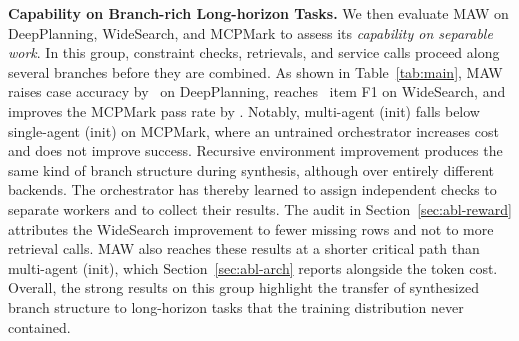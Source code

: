 \textbf{Capability on Branch-rich Long-horizon Tasks.}\quad
We then evaluate MAW on DeepPlanning, WideSearch, and MCPMark to assess its \emph{capability on separable work}.
In this group, constraint checks, retrievals, and service calls proceed along several branches before they are combined.
As shown in Table~\ref{tab:main}, MAW raises case accuracy by \fillin\ on DeepPlanning, reaches \fillin\ item F1 on WideSearch, and improves the MCPMark pass rate by \fillin.
Notably, multi-agent (init) falls below single-agent (init) on MCPMark, where an untrained orchestrator increases cost and does not improve success.
Recursive environment improvement produces the same kind of branch structure during synthesis, although over entirely different backends.
The orchestrator has thereby learned to assign independent checks to separate workers and to collect their results.
The audit in Section~\ref{sec:abl-reward} attributes the WideSearch improvement to fewer missing rows and not to more retrieval calls.
MAW also reaches these results at a shorter critical path than multi-agent (init), which Section~\ref{sec:abl-arch} reports alongside the token cost.
Overall, the strong results on this group highlight the transfer of synthesized branch structure to long-horizon tasks that the training distribution never contained.
